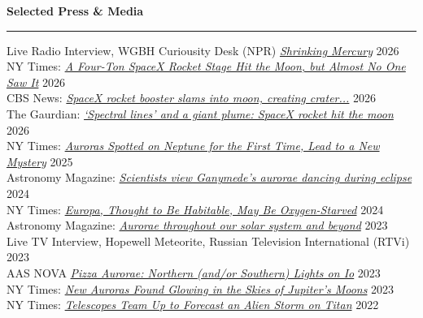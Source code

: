 \documentclass[12pt]{report}
\begin{document}
\noindent\bf{Selected Press \& Media}\rm \hspace*{\fill} \\
\rule{\textwidth}{1pt}
\noindent Live Radio Interview, WGBH Curiousity Desk (NPR) \href{https://www.wgbh.org/podcasts/the-curiosity-desk} {{\it Shrinking Mercury}} \hfill 2026\\
\noindent NY Times: \href{https://www.nytimes.com/2026/08/05/science/space-x-moon-crash-confirmation.html} {{\it A Four-Ton SpaceX Rocket Stage Hit the Moon, but Almost No One Saw It}} \hfill 2026\\
\noindent CBS News: \href{https://www.cbsnews.com/news/spacex-rocket-moon-collision/}{{\it SpaceX rocket booster slams into moon, creating crater...}} \hfill 2026\\
\noindent The Gaurdian: \href{https://www.theguardian.com/science/2026/aug/06/spacex-rocket-crash-into-moon-impact}{{\it ‘Spectral lines’ and a giant plume: SpaceX rocket hit the moon}} \hfill 2026\\
\noindent NY Times: \href{https://www.nytimes.com/2025/03/26/science/neptune-aurora-nasa-webb-telescope.html}{{\it Auroras Spotted on Neptune for the First Time, Lead to a New Mystery}} \hfill 2025\\
\noindent Astronomy Magazine: \href{https://www.astronomy.com/science/scientists-view-ganymedes-aurorae-dancing-during-eclipse/}{{\it Scientists view Ganymede’s aurorae dancing during eclipse}} \hfill 2024\\
\noindent NY Times: \href{https://www.nytimes.com/2024/03/04/science/europa-moon-oxygen.html}{{\it Europa, Thought to Be Habitable, May Be Oxygen-Starved}} \hfill 2024\\
\noindent Astronomy Magazine: \href{https://www.astronomy.com/science/aurorae-throughout-our-solar-system-and-beyond}{{\it Aurorae throughout our solar system and beyond}} \hfill 2023\\
\noindent Live TV Interview, Hopewell Meteorite, Russian Television International (RTVi) \hfill 2023\\
\noindent AAS NOVA \href{https://aasnova.org/2023/07/25/pizza-aurorae-northern-and-or-southern-lights-on-io/}{{\it Pizza Aurorae: Northern (and/or Southern) Lights on Io}} \hfill 2023\\
\noindent NY Times: \href{https://www.nytimes.com/2023/02/16/science/auroras-jupiter-moons.html}{{\it New Auroras Found Glowing in the Skies of Jupiter’s Moons}} \hfill 2023\\
\noindent NY Times: \href{https://www.nytimes.com/2022/12/05/science/titan-webb-telescope-pictures.html}{{\it Telescopes Team Up to Forecast an Alien Storm on Titan}} \hfill 2022\\
\end{document}
